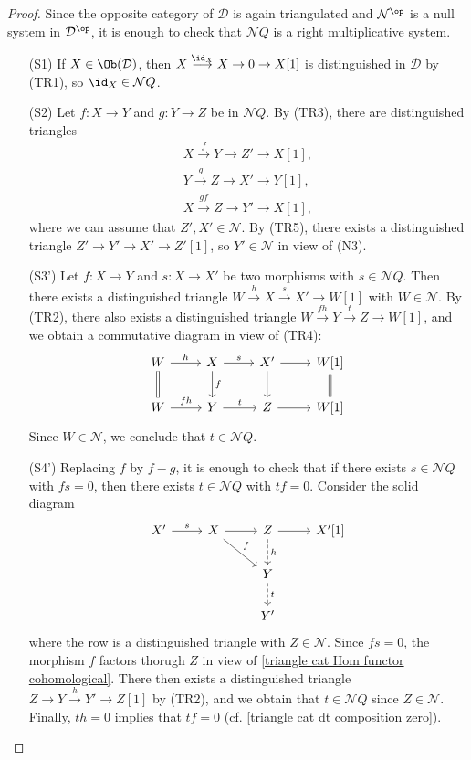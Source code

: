 \begin{proof}
Since the opposite category of $\mathcal{D}$ is again triangulated and $\mathcal{N}^{\op}$ is a null system in $\mathcal{D}^{\op}$, it is enough to check that $\mathcal{N}Q$ is a right multiplicative system.
\begin{enumerate}[leftmargin=40pt]
    \item[(S1)] If $X\in\Ob(\mathcal{D})$, then $X\stackrel{\id_X}{\longrightarrow} X\to 0\to X[1]$ is distinguished in $\mathcal{D}$ by (TR1), so $\id_X\in\mathcal{N}Q$.
    \item[(S2)] Let $f:X\to Y$ and $g:Y\to Z$ be in $\mathcal{N}Q$. By (TR3), there are distinguished triangles
    \begin{gather*}
    X\stackrel{f}{\to} Y\to Z'\to X[1],\\
    Y\stackrel{g}{\to} Z\to X'\to Y[1],\\
    X\stackrel{gf}{\to} Z\to Y'\to X[1],
    \end{gather*}
    where we can assume that $Z',X'\in\mathcal{N}$. By (TR5), there exists a distinguished triangle $Z'\to Y'\to X'\to Z'[1]$, so $Y'\in\mathcal{N}$ in view of (N3).
    \item[(S3')] Let $f:X\to Y$ and $s:X\to X'$ be two morphisms with $s\in\mathcal{N}Q$. Then there exists a distinguished triangle $W\stackrel{h}{\to} X\stackrel{s}{\to} X'\to W[1]$ with $W\in\mathcal{N}$. By (TR2), there also exists a distinguished triangle $W\stackrel{fh}{\to} Y\stackrel{t}{\to} Z\to W[1]$, and we obtain a commutative diagram in view of (TR4):
    \[\begin{tikzcd}
    W\ar[r,"h"]\ar[d,equal]&X\ar[r,"s"]\ar[d,"f"]&X'\ar[r]\ar[d]&W[1]\ar[d,equal]\\
    W\ar[r,"fh"]&Y\ar[r,"t"]&Z\ar[r]&W[1]
    \end{tikzcd}\]
    Since $W\in\mathcal{N}$, we conclude that $t\in\mathcal{N}Q$.
    \item[(S4')] Replacing $f$ by $f-g$, it is enough to check that if there exists $s\in\mathcal{N}Q$ with $fs=0$, then there exists $t\in\mathcal{N}Q$ with $tf=0$. Consider the solid diagram
    \[\begin{tikzcd}
    X'\ar[r,"s"]&X\ar[r]\ar[rd,"f"]&Z\ar[r]\ar[d,dashed,"h"]&X'[1]\\
    &&Y\ar[d,dashed,"t"]&\\
    &&Y'
    \end{tikzcd}\]
    where the row is a distinguished triangle with $Z\in\mathcal{N}$. Since $fs=0$, the morphism $f$ factors thorugh $Z$ in view of \cref{triangle cat Hom functor cohomological}. There then exists a distinguished triangle $Z\to Y\stackrel{h}{\to} Y'\to Z[1]$ by (TR2), and we obtain that $t\in\mathcal{N}Q$ since $Z\in\mathcal{N}$. Finally, $th=0$ implies that $tf=0$ (cf. \cref{triangle cat dt composition zero}).

\end{enumerate}
\end{proof}
